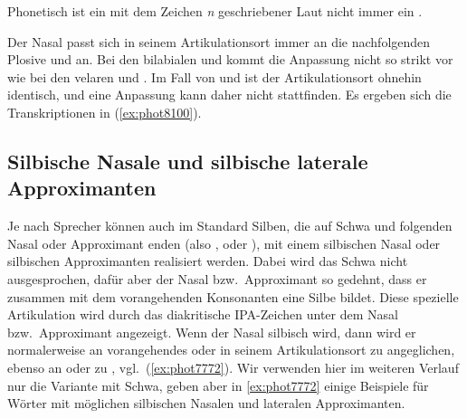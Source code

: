 Phonetisch ist ein mit dem Zeichen \textit{n} geschriebener Laut nicht immer ein \textipa{[n]}.


Der Nasal \textipa{[n]} passt sich in seinem Artikulationsort immer an die nachfolgenden Plosive \textipa{[k]} und \textipa{[g]} an.
Bei den bilabialen \textipa{[p]} und \textipa{[b]} kommt die Anpassung nicht so strikt vor wie bei den velaren \textipa{[k]} und \textipa{[g]}.
Im Fall von \textipa{[t]} und \textipa{[d]} ist der Artikulationsort ohnehin identisch, und eine Anpassung kann daher nicht stattfinden.
Es ergeben sich die Transkriptionen in (\ref{ex:phot8100}).

\begin{exe}
  \ex\label{ex:phot8100}
  \begin{xlist}
    \ex{\textipa{[klINk@]}, \textipa{[baNk]}, \textipa{[PUNg@n\t{aO}]}}
  \end{xlist}
\end{exe}

\subsection{Silbische Nasale und silbische laterale Approximanten}

\label{sec:silbnasal}

Je nach Sprecher können auch im Standard Silben, die auf Schwa und folgenden Nasal oder Approximant enden (also \textipa{[@n]}, \textipa{[@m]} oder \textipa{[@l]}), mit einem silbischen Nasal oder silbischen Approximanten realisiert werden.
Dabei wird das Schwa nicht ausgesprochen, dafür aber der Nasal bzw.\ Approximant so gedehnt, dass er zusammen mit dem vorangehenden Konsonanten eine Silbe bildet.
Diese spezielle Artikulation wird durch das diakritische IPA-Zeichen \textipa{[\s{ }]} unter dem Nasal bzw.\ Approximant angezeigt.
Wenn der Nasal \textipa{[n]} silbisch wird, dann wird er normalerweise an vorangehendes \textipa{[b]} oder \textipa{[p]} in seinem Artikulationsort zu \textipa{[m]} angeglichen, ebenso an \textipa{[g]} oder \textipa{[k]} zu \textipa{[N]}, vgl.\ (\ref{ex:phot7772}).
Wir verwenden hier im weiteren Verlauf nur die Variante mit Schwa, geben aber in \ref{ex:phot7772} einige Beispiele für Wörter mit möglichen silbischen Nasalen und lateralen Approximanten.

